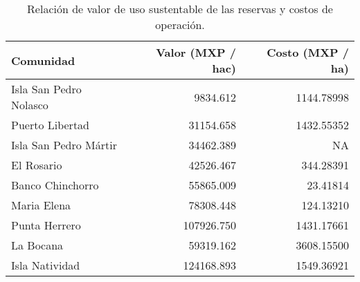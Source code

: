 \begin{table}

\caption{\label{tab:sust_val_cost}Relación de valor de uso sustentable de las reservas y costos de operación.}
\centering
\begin{tabular}[t]{lrr}
\toprule
Comunidad & Valor (MXP / hac) & Costo (MXP / ha)\\
\midrule
Isla San Pedro Nolasco & 9834.612 & 1144.78998\\
Puerto Libertad & 31154.658 & 1432.55352\\
Isla San Pedro Mártir & 34462.389 & NA\\
El Rosario & 42526.467 & 344.28391\\
Banco Chinchorro & 55865.009 & 23.41814\\
\addlinespace
Maria Elena & 78308.448 & 124.13210\\
Punta Herrero & 107926.750 & 1431.17661\\
La Bocana & 59319.162 & 3608.15500\\
Isla Natividad & 124168.893 & 1549.36921\\
\bottomrule
\end{tabular}
\end{table}
